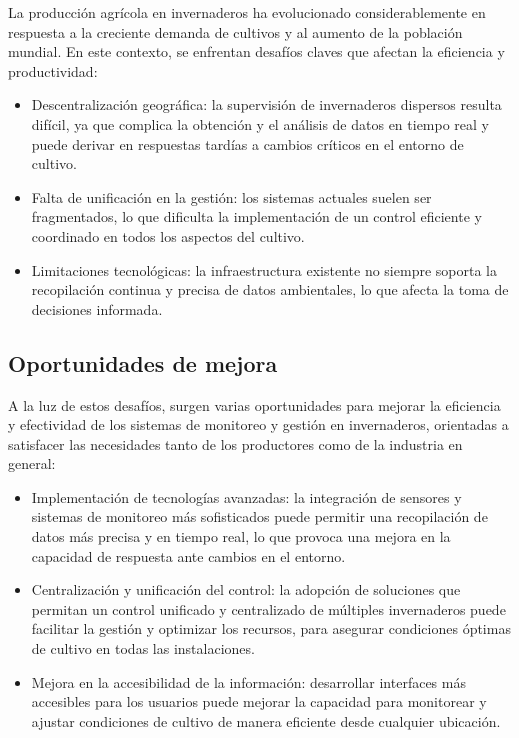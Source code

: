 La producción agrícola en invernaderos ha evolucionado considerablemente en respuesta a la creciente demanda de cultivos y al aumento de la población mundial. En este contexto, se enfrentan desafíos claves que afectan la eficiencia y productividad:

\begin{itemize}
	\item Descentralización geográfica: la supervisión de invernaderos dispersos resulta difícil, ya que complica la obtención y el análisis de datos en tiempo real y puede derivar en respuestas tardías a cambios críticos en el entorno de cultivo.
	\item Falta de unificación en la gestión: los sistemas actuales suelen ser fragmentados, lo que dificulta la implementación de un control eficiente y coordinado en todos los aspectos del cultivo.
	\item Limitaciones tecnológicas: la infraestructura existente no siempre soporta la recopilación continua y precisa de datos ambientales, lo que afecta la toma de decisiones informada.
\end{itemize}

\subsection{Oportunidades de mejora}

A la luz de estos desafíos, surgen varias oportunidades para mejorar la eficiencia y efectividad de los sistemas de monitoreo y gestión en invernaderos, orientadas a satisfacer las necesidades tanto de los productores como de la industria en general:

\begin{itemize}
	\item Implementación de tecnologías avanzadas: la integración de sensores y sistemas de monitoreo más sofisticados puede permitir una recopilación de datos más precisa y en tiempo real, lo que provoca una mejora en la capacidad de respuesta ante cambios en el entorno.
	\item Centralización y unificación del control: la adopción de soluciones que permitan un control unificado y centralizado de múltiples invernaderos puede facilitar la gestión y optimizar los recursos, para asegurar condiciones óptimas de cultivo en todas las instalaciones.
	\item Mejora en la accesibilidad de la información: desarrollar interfaces más accesibles para los usuarios puede mejorar la capacidad para monitorear y ajustar condiciones de cultivo de manera eficiente desde cualquier ubicación.
\end{itemize}

